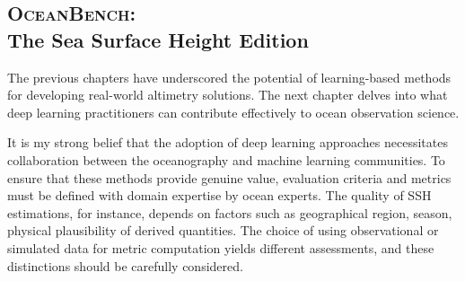 


% 
% 




% 




\begin{bibunit}

\chapter*{\textsc{OceanBench}: \\ The Sea Surface Height Edition}
% 

The previous chapters have underscored the potential of learning-based methods for developing real-world altimetry solutions. The next chapter delves into what deep learning practitioners can contribute effectively to ocean observation science.

It is my strong belief that the adoption of deep learning approaches necessitates collaboration between the oceanography and machine learning communities. To ensure that these methods provide genuine value, evaluation criteria and metrics must be defined with domain expertise by ocean experts. The quality of SSH estimations, for instance, depends on factors such as geographical region, season, physical plausibility of derived quantities. The choice of using observational or simulated data for metric computation yields different assessments, and these distinctions should be carefully considered.


\end{bibunit}
